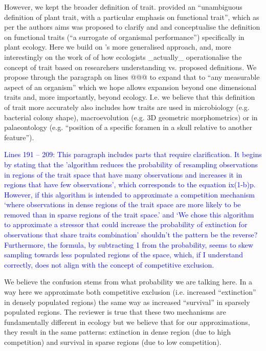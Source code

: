 \documentclass[
]{article}
\begin{document}
However, we kept the broader definition of trait.
\citealt{violle2007let} provided an ``unambiguous definition of plant trait, with a particular emphasis on functional trait'', which as per the authors aims was proposed to clarify and and conceptualise the definition on functional traits (``a surrogate of organismal performance'') specifically in plant ecology.
Here we build on \citealt{mcgill2006rebuilding}'s more generalised approach, and, more interestingly on the work of \citealt{dawson2021traits} of how ecologists _actually_ operationalise the concept of trait based on researchers understanding vs. proposed definitions.
We propose through the paragraph on lines @@@ to expand that to ``any measurable aspect of an organism'' which we hope allows expansion beyond one dimensional traits and, more importantly, beyond ecology.
I.e. we believe that this definition of trait more accurately also includes how traits are used in microbiology (e.g. bacterial colony shape), macroevolution (e.g. 3D geometric morphometrics) or in palaeontology (e.g. ``position of a specific foramen in a skull relative to another feature'').

 
\textcolor{blue}{Lines 191 – 209: This paragraph includes parts that require clarification.
It begins by stating that the 'algorithm reduces the probability of resampling observations in regions of the trait space that have many observations and increases it in regions that have few observations', which corresponds to the equation ix(1-b)p.
However, if this algorithm is intended to approximate a competition mechanism ‘where observations in dense regions of the trait space are more likely to be removed than in sparse regions of the trait space.’ and ‘We chose this algorithm to approximate a stressor that could increase the probability of extinction for observations that share traits combination’ shouldn’t the pattern be the reverse?
Furthermore, the formula, by subtracting 1 from the probability, seems to skew sampling towards less populated regions of the space, which, if I understand correctly, does not align with the concept of competitive exclusion.}

We believe the confusion stems from what probability we are talking here.
In a way here we approximate both competitive exclusion (i.e. increased ``extinction'' in densely populated regions) the same way as increased ``survival'' in sparsely populated regions.
The reviewer is true that these two mechanisms are fundamentally different in ecology but we believe that for our approximations, they result in the same patterns: extinction in dense region (due to high competition) and survival in sparse regions (due to low competition).
\end{document}

